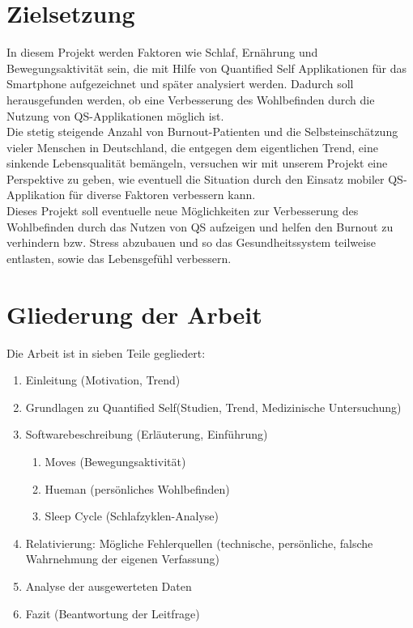 \section{Zielsetzung}
\label{ch:Einleitung:sec:Zielsetzung}

In diesem Projekt werden Faktoren wie Schlaf, Ernährung und Bewegungsaktivität sein, die mit Hilfe von Quantified Self Applikationen für das Smartphone aufgezeichnet und später analysiert werden. 
Dadurch soll herausgefunden werden, ob eine Verbesserung des Wohlbefinden durch die Nutzung von QS-Applikationen möglich ist. \\
Die stetig steigende Anzahl von Burnout-Patienten und die Selbsteinschätzung vieler Menschen in Deutschland, die entgegen dem eigentlichen Trend, eine sinkende Lebensqualität bemängeln, versuchen wir mit unserem Projekt eine Perspektive zu geben, wie eventuell die Situation durch den Einsatz mobiler QS-Applikation für diverse Faktoren verbessern kann. \\
Dieses Projekt soll eventuelle neue Möglichkeiten zur Verbesserung des Wohlbefinden durch das Nutzen von QS aufzeigen und helfen den Burnout zu verhindern bzw. Stress abzubauen und so das Gesundheitssystem teilweise entlasten, sowie das Lebensgefühl verbessern. 

\section{Gliederung der Arbeit}
\label{ch:Einleitung:sec:GliederungDerArbeit}

Die Arbeit ist in sieben Teile gegliedert:

\begin{enumerate}
\def\labelenumi{\arabic{enumi}.}
\itemsep1pt\parskip0pt
\item
  Einleitung (Motivation, Trend)
\item
  Grundlagen zu Quantified Self(Studien, Trend, Medizinische
  Untersuchung)
\item
  Softwarebeschreibung (Erläuterung, Einführung)

  \begin{enumerate}
  \def\labelenumii{\alph{enumii}.}
  \itemsep1pt\parskip0pt
  \item
    Moves (Bewegungsaktivität)\\
  \item
    Hueman (persönliches Wohlbefinden)\\
  \item
    Sleep Cycle (Schlafzyklen-Analyse)
  \end{enumerate}
\item
  Relativierung: Mögliche Fehlerquellen (technische, persönliche,
  falsche Wahrnehmung der eigenen Verfassung)
\item
  Analyse der ausgewerteten Daten
\item
  Fazit (Beantwortung der Leitfrage)
\end{enumerate}

